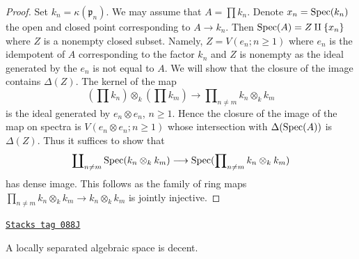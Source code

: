 \begin{proof}
Set $k_n = \kappa(\mathfrak p_n)$. We may assume that $A = \prod k_n$.
Denote $x_n = \operatorname{Spec}(k_n)$ the open and closed point corresponding to
$A \to k_n$. Then $\operatorname{Spec}(A) = Z \amalg \{x_n\}$ where $Z$ is a nonempty
closed subset. Namely, $Z = V(e_n; n \geq 1)$ where $e_n$
is the idempotent of $A$ corresponding to the factor $k_n$
and $Z$ is nonempty as the ideal generated by the $e_n$ is not
equal to $A$. We will show that the closure of the image
contains $\Delta(Z)$. The kernel of the map
$$
(\prod k_n) \otimes_k (\prod k_m)
\longrightarrow
\prod\nolimits_{n \not = m} k_n \otimes_k k_m
$$
is the ideal generated by $e_n \otimes e_n$, $n \geq 1$.
Hence the closure of the image of the map on spectra is
$V(e_n \otimes e_n; n \geq 1)$ whose intersection with $\Delta(\operatorname{Spec}(A))$
is $\Delta(Z)$. Thus it suffices to show that
$$
\coprod\nolimits_{n \not = m} \operatorname{Spec}(k_n \otimes_k k_m)
\longrightarrow
\operatorname{Spec}(\prod\nolimits_{n \not = m} k_n \otimes_k k_m)
$$
has dense image. This follows as the family of ring maps
$\prod_{n \not = m} k_n \otimes_k k_m \to k_n \otimes_k k_m$
is jointly injective.
\end{proof}

\begin{lemma}

\label{decent-spaces-lemma-locally-separated-decent}
\href{https://stacks.math.columbia.edu/tag/088J}{\texttt{Stacks tag 088J}}

A locally separated algebraic space is decent.
\end{lemma}

